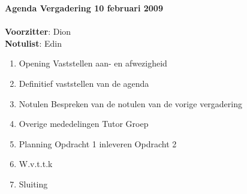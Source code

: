 \documentclass[11pt,oneside,a4paper]{article}
\begin{document}
\textbf{{\LARGE{Agenda Vergadering 10 februari 2009}}}\\ \\
\textbf{Voorzitter}: Dion\\
\textbf{Notulist}: Edin\\
\begin{enumerate}
    \item Opening
        \subitem Vaststellen aan- en afwezigheid
    \item Definitief vaststellen van de agenda
    \item Notulen
        \subitem Bespreken van de notulen van de vorige vergadering
    \item Overige mededelingen
        \subitem Tutor
        \subitem Groep
    \item Planning
            \subitem Opdracht 1 inleveren
            \subitem Opdracht 2
    \item W.v.t.t.k
    \item Sluiting
\end{enumerate}
\end{document}
